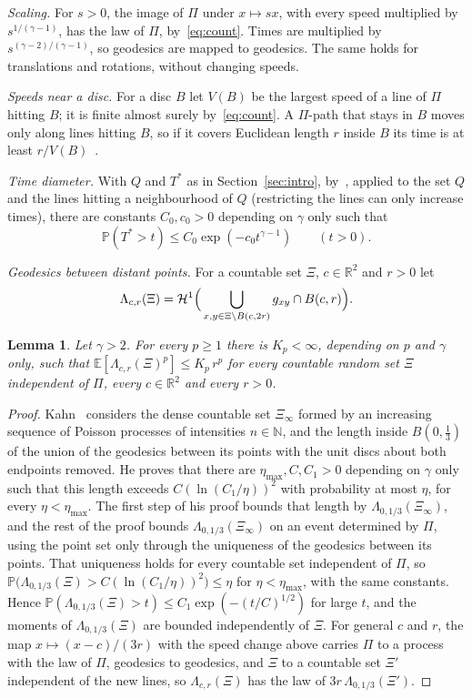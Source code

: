 \documentclass[11pt]{amsart}
\newtheorem{lemma}[theorem]{Lemma}
\theoremstyle{remark}
\newcommand{\R}{\mathbb{R}}
\newcommand{\E}{\mathbb{E}}
\newcommand{\Prob}{\mathbb{P}}
\newcommand{\Hone}{\mathcal{H}^1}
\begin{document}
\emph{Scaling.} For $s>0$, the image of $\Pi$ under $x\mapsto sx$, with every speed multiplied by $s^{1/(\gamma-1)}$,
has the law of $\Pi$, by~\eqref{eq:count}. Times are multiplied by $s^{(\gamma-2)/(\gamma-1)}$, so geodesics are mapped
to geodesics. The same holds for translations and rotations, without changing speeds.

\emph{Speeds near a disc.} For a disc $B$ let $V(B)$ be the largest speed of a line of $\Pi$ hitting $B$; it is finite
almost surely by~\eqref{eq:count}. A $\Pi$-path that stays in $B$ moves only along lines hitting $B$, so if it covers
Euclidean length $r$ inside $B$ its time is at least $r/V(B)$~\cite[(15)]{Kahn}.

\emph{Time diameter.} With $Q$ and $T^*$ as in Section~\ref{sec:intro}, by~\cite[Theorem~3.1]{Kahn},
applied to the set $Q$ and the lines hitting a neighbourhood of $Q$ (restricting the lines can only increase times),
there are constants $C_0,c_0>0$ depending on $\gamma$ only such that
\begin{equation}\label{eq:diam}
\Prob(T^*>t)\le C_0\exp(-c_0t^{\gamma-1})\qquad(t>0).
\end{equation}

\emph{Geodesics between distant points.} For a countable set $\Xi$, $c\in\R^2$ and $r>0$ let
\[
\Lambda_{c,r}(\Xi)=\Hone\Bigl(\,\bigcup_{x,y\in\Xi\setminus B(c,2r)}g_{xy}\cap B(c,r)\Bigr).
\]

\begin{lemma}\label{lem:far}
Let $\gamma>2$. For every $p\ge1$ there is $K_p<\infty$, depending on $p$ and $\gamma$ only, such that
$\E[\Lambda_{c,r}(\Xi)^p]\le K_p\,r^p$ for every countable random set $\Xi$ independent of $\Pi$, every $c\in\R^2$
and every $r>0$.
\end{lemma}

\begin{proof}
Kahn~\cite[Theorem~6.1]{Kahn} considers the dense countable set $\Xi_\infty$ formed by an increasing sequence of
Poisson processes of intensities $n\in\mathbb N$, and the length inside $B(0,\frac13)$ of the union of the geodesics
between its points with the unit discs about both endpoints removed. He proves that there are
$\eta_{\max},C,C_1>0$ depending on $\gamma$ only such that this length exceeds $C(\ln(C_1/\eta))^2$ with probability
at most $\eta$, for every $\eta<\eta_{\max}$. The first step of his proof bounds that length by
$\Lambda_{0,1/3}(\Xi_\infty)$, and the rest of the proof bounds $\Lambda_{0,1/3}(\Xi_\infty)$ on an event determined by
$\Pi$, using the point set only through the uniqueness of the geodesics between its points. That uniqueness holds for
every countable set independent of $\Pi$, so
$\Prob\bigl(\Lambda_{0,1/3}(\Xi)>C(\ln(C_1/\eta))^2\bigr)\le\eta$ for $\eta<\eta_{\max}$, with the same constants.
Hence $\Prob(\Lambda_{0,1/3}(\Xi)>t)\le C_1\exp(-(t/C)^{1/2})$ for large $t$, and the moments of $\Lambda_{0,1/3}(\Xi)$
are bounded independently of $\Xi$. For general $c$ and $r$, the map $x\mapsto(x-c)/(3r)$ with the speed change above
carries $\Pi$ to a process with the law of $\Pi$, geodesics to geodesics, and $\Xi$ to a countable set $\Xi'$
independent of the new lines, so $\Lambda_{c,r}(\Xi)$ has the law of $3r\,\Lambda_{0,1/3}(\Xi')$.
\end{proof}
\end{document}
